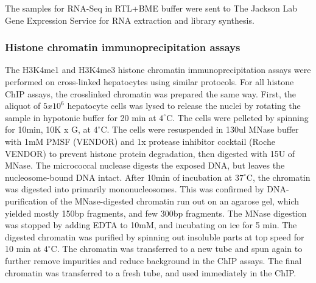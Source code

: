 \documentclass[10pt,letterpaper]{article}
\begin{document}
The samples for RNA-Seq in RTL+BME buffer were sent to The Jackson Lab
Gene Expression Service for RNA extraction and library synthesis.

\hypertarget{histone-chromatin-immunoprecipitation-assays}{%
\subsubsection{Histone chromatin immunoprecipitation
assays}\label{histone-chromatin-immunoprecipitation-assays}}

The H3K4me1 and H3K4me3 histone chromatin immunoprecipitation assays
were performed on cross-linked hepatocytes using similar protocols. For
all histone ChIP assays, the crosslinked chromatin was prepared the same
way. First, the aliquot of \(5x10^6\) hepatocyte cells was lysed to
release the nuclei by rotating the sample in hypotonic buffer for 20 min
at \(4^\circ\)C. The cells were pelleted by spinning for 10min, 10K x G,
at \(4^\circ\)C. The cells were resuspended in 130ul MNase buffer with
1mM PMSF (VENDOR) and 1x protease inhibitor cocktail (Roche VENDOR) to
prevent histone protein degradation, then digested with 15U of MNase.
The micrococcal nuclease digests the exposed DNA, but leaves the
nucleosome-bound DNA intact. After 10min of incubation at \(37^\circ\)C,
the chromatin was digested into primarily mononucleosomes. This was
confirmed by DNA-purification of the MNase-digested chromatin run out on
an agarose gel, which yielded mostly 150bp fragments, and few 300bp
fragments. The MNase digestion was stopped by adding EDTA to 10mM, and
incubating on ice for 5 min. The digested chromatin was purified by
spinning out insoluble parts at top speed for 10 min at \(4^\circ\)C.
The chromatin was transferred to a new tube and spun again to further
remove impurities and reduce background in the ChIP assays. The final
chromatin was transferred to a fresh tube, and used immediately in the
ChIP.
\end{document}
